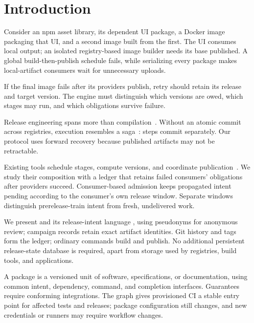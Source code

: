 \section{Introduction}
\label{sec:intro}
Consider an npm asset library, its dependent UI package, a Docker image
packaging that UI, and a second image built from the first. The UI consumes
local output; an isolated registry-based image builder needs its base
published. A global build-then-publish schedule fails, while serializing
every package makes local-artifact consumers wait for unnecessary uploads.

If the final image fails after its providers publish, retry should retain its
release and target version. The engine must distinguish which versions are
owed, which stages may run, and which obligations survive failure.

Release engineering spans more than compilation~\cite{adams}. Without an atomic
commit across registries, execution resembles a saga~\cite{sagas}:
steps commit separately. Our protocol uses forward recovery because published
artifacts may not be retractable.

Existing tools schedule stages, compute versions, and coordinate
publication~\cite{lerna,nx,changesets,releaseplease,semanticrelease}.
We study their composition with a ledger that retains failed consumers'
obligations after providers succeed. Consumer-based admission keeps propagated
intent pending according to the consumer's own release window. Separate
windows distinguish prerelease-train intent from fresh, undelivered work.

We present \tool{} and its release-intent language \lang{}, using pseudonyms
for anonymous review; campaign records retain exact artifact identities.
Git history and tags form the ledger; ordinary commands build and publish.
No additional persistent release-state database is required, apart from
storage used by registries, build tools, and applications.

A package is a versioned unit of software, specifications, or documentation,
using common intent, dependency, command, and completion interfaces.
Guarantees require conforming integrations. The graph gives provisioned CI
a stable entry point for affected tests and releases; package configuration
still changes, and new credentials or runners may require workflow changes.


